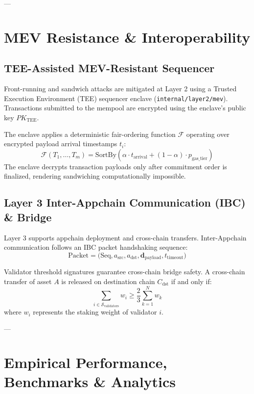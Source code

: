 \documentclass[10pt,journal,compsoc,twocolumn]{IEEEtran}
\begin{document}
---

\section{MEV Resistance \& Interoperability}
\label{sec:mev_interop}

\subsection{TEE-Assisted MEV-Resistant Sequencer}
Front-running and sandwich attacks are mitigated at Layer 2 using a Trusted Execution Environment (TEE) sequencer enclave (\texttt{internal/layer2/mev}). Transactions submitted to the mempool are encrypted using the enclave's public key $PK_{\text{TEE}}$.

The enclave applies a deterministic fair-ordering function $\mathcal{F}$ operating over encrypted payload arrival timestamps $t_i$:
\begin{equation}
\mathcal{F}(T_1, \dots, T_m) = \text{SortBy}\left( \alpha \cdot t_{\text{arrival}} + (1-\alpha) \cdot p_{\text{gas\_tier}} \right)
\end{equation}
The enclave decrypts transaction payloads only after commitment order is finalized, rendering sandwiching computationally impossible.

\subsection{Layer 3 Inter-Appchain Communication (IBC) \& Bridge}
Layer 3 supports appchain deployment and cross-chain transfers. Inter-Appchain communication follows an IBC packet handshaking sequence:
\begin{equation}
\text{Packet} = \Big( \text{Seq}, a_{\text{src}}, a_{\text{dst}}, \mathbf{d}_{\text{payload}}, t_{\text{timeout}} \Big)
\end{equation}

Validator threshold signatures guarantee cross-chain bridge safety. A cross-chain transfer of asset $A$ is released on destination chain $C_{\text{dst}}$ if and only if:
\begin{equation}
\sum_{i \in \mathcal{S}_{\text{validators}}} w_i \ge \frac{2}{3} \sum_{k=1}^N w_k
\end{equation}
where $w_i$ represents the staking weight of validator $i$.

---

\section{Empirical Performance, Benchmarks \& Analytics}
\label{sec:benchmarks}
\end{document}
